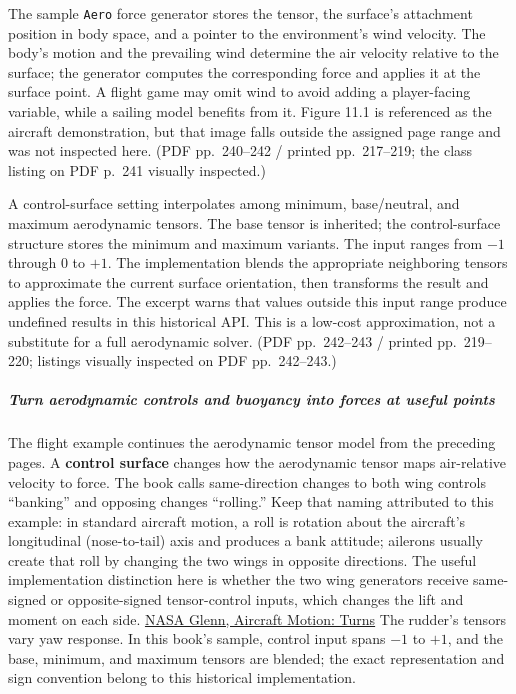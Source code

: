 The sample \texttt{Aero} force generator stores the tensor, the surface's attachment position in body space, and a pointer to the environment's wind velocity. The body's motion and the prevailing wind determine the air velocity relative to the surface; the generator computes the corresponding force and applies it at the surface point. A flight game may omit wind to avoid adding a player-facing variable, while a sailing model benefits from it. Figure 11.1 is referenced as the aircraft demonstration, but that image falls outside the assigned page range and was not inspected here. (PDF pp.~240--242 / printed pp.~217--219; the class listing on PDF p.~241 visually inspected.)

A control-surface setting interpolates among minimum, base/neutral, and maximum aerodynamic tensors. The base tensor is inherited; the control-surface structure stores the minimum and maximum variants. The input ranges from \(-1\) through \(0\) to \(+1\). The implementation blends the appropriate neighboring tensors to approximate the current surface orientation, then transforms the result and applies the force. The excerpt warns that values outside this input range produce undefined results in this historical API. This is a low-cost approximation, not a substitute for a full aerodynamic solver. (PDF pp.~242--243 / printed pp.~219--220; listings visually inspected on PDF pp.~242--243.)

\subparagraph{Turn aerodynamic controls and buoyancy into forces at useful points}\label{turn-aerodynamic-controls-and-buoyancy-into-forces-at-useful-points}

The flight example continues the aerodynamic tensor model from the preceding pages. A \textbf{control surface} changes how the aerodynamic tensor maps air-relative velocity to force. The book calls same-direction changes to both wing controls ``banking'' and opposing changes ``rolling.'' Keep that naming attributed to this example: in standard aircraft motion, a roll is rotation about the aircraft's longitudinal (nose-to-tail) axis and produces a bank attitude; ailerons usually create that roll by changing the two wings in opposite directions. The useful implementation distinction here is whether the two wing generators receive same-signed or opposite-signed tensor-control inputs, which changes the lift and moment on each side. \href{https://www1.grc.nasa.gov/beginners-guide-to-aeronautics/aircraft-motion-turns/}{NASA Glenn, Aircraft Motion: Turns} The rudder's tensors vary yaw response. In this book's sample, control input spans \(-1\) to \(+1\), and the base, minimum, and maximum tensors are blended; the exact representation and sign convention belong to this historical implementation.

